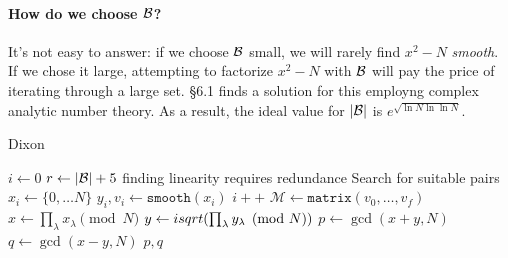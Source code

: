 \paragraph{How do we choose $\mathcal{B}$?}
It's not easy to answer: if we choose $\mathcal{B}$ small, we will rarely find
$x^2 -N$ \emph{smooth}. If we chose it large, attempting to factorize $x^2 -N$
with $\mathcal{B}$ will pay the price of iterating through a large set.
\cite{Crandall} \S 6.1 finds a solution for this employng complex analytic
number theory. As a  result, the ideal value for $|\mathcal{B}|$ is
$e^{\sqrt{\ln N \ln \ln N}}$.

\begin{algorithm}
  \caption{Dixon}
  \begin{algorithmic}
    \State $i \gets 0$
    \State $r \gets |\mathcal{B}| + 5$
    \Comment finding linearity requires redundance
    \Comment Search for suitable pairs
    \State $x_i \gets \{0, \ldots N\}$
    \State $y_i, v_i \gets \texttt{smooth}(x_i)$
     $i++$ \EndIf
  \EndWhile
  \State $\mathcal{M} \gets \texttt{matrix}(v_0, \ldots, v_f)$
    \State $x \gets \prod_\lambda x_\lambda \pmod{N}$
    \State $y \gets isqrt(\prod_\lambda y_\lambda \pmod{N})$
      \State $p \gets \gcd(x+y, N)$
      \State $q \gets \gcd(x-y, N)$
      \State \Return $p, q$
    \EndIf
  \EndFor
  \end{algorithmic}
\end{algorithm}

